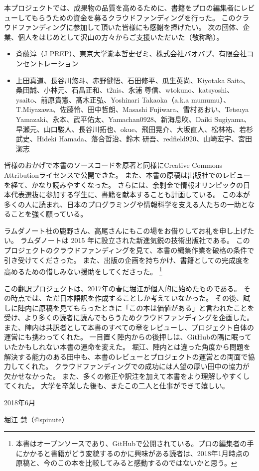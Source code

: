 本プロジェクトでは、成果物の品質を高めるために、書籍をプロの編集者にレビューしてもらうための資金を募るクラウドファンディングを行った。
このクラウドファンディングに参加して頂いた皆様にも感謝を捧げたい。
次の団体、企業、個人をはじめとして沢山の方々からご支援いただいた（敬称略）。 %
\begin{itemize}
\item 斉藤淳（J PREP）、東京大学瀧本哲史ゼミ、株式会社バオバブ、有限会社コンセントレーション
\item 上田真道、長谷川悠斗、赤野健悟、石田修平、瓜生英尚、Kiyotaka Saito、桑田誠、小林元、石畠正和、t2nis、永浦 尊信、wtokuno、katsyoshi、ysaito、前原貴憲、髙木正弘、Yoshinari Takaoka（a.k.a mumumu）、T.Miyazawa、佐藤怜、田中哲朗、Masashi Fujiwara、雪村あおい、Tetsuya Yamazaki、永本、武平佑太、Yamachan0928、新海息吹、Daiki Sugiyama、早瀬元、山口駿人、長谷川拓也、okue、飛田晃介、大坂直人、松林祐、若杉武史、Hideki Hamada、落合哲治、鈴木 研吾、redfield920、山崎宏宇、宮田潔志
\end{itemize}

皆様のおかげで本書のソースコードを原著と同様にCreative Commons Attributionライセンスで公開できた。
また、本書の原稿は出版社でのレビューを経て、かなり読みやすくなった。
さらには、余剰金で情報オリンピックの日本代表選抜に参加する学生に、書籍を献本することも計画している。
この本が多くの人に読まれ、日本のプログラミングや情報科学を支える人たちの一助となることを強く願っている。

ラムダノート社の鹿野さん、高尾さんにもこの場をお借りしてお礼を申し上げたい。
ラムダノートは 2015 年に設立された新進気鋭の技術出版社である。
このプロジェクトのクラウドファンディングを見て、本書の編集作業を破格の条件で引き受けてくださった。
また、出版の企画を持ちかけ、書籍としての完成度を高めるための惜しみない援助をしてくださった。
\footnote{本書はオープンソースであり、GitHubで公開されている。プロの編集者の手にかかると書籍がどう変貌するのかに興味がある読者は、2018年1月時点の原稿と、今のこの本を比較してみると感動するのではないかと思う。}

この翻訳プロジェクトは、2017年の春に堀江が個人的に始めたものである。
その時点では、ただ日本語訳を作成することしか考えていなかった。
その後、試しに陣内に原稿を見てもらったときに「この本は価値がある」と言われたことを受け、より多くの読者に読んでもらうためクラウドファンディングを企画した。
また、陣内は共訳者として本書のすべての章をレビューし、プロジェクト自体の運営にも携わってくれた。
一目置く陣内からの後押しは、GitHubの隅に眠っていたかもしれない本書の運命を変えた。
堀江、陣内とは違った角度から問題を解決する能力のある田中も、本書のレビューとプロジェクトの運営との両面で協力してくれた。
クラウドファンディングでの成功には人望の厚い田中の協力が欠かせなかった。
また、多くの修正や訳注を加えて本書をより理解しやすくしてくれた。
大学を卒業した後も、またこの二人と仕事ができて嬉しい。

\noindent\hspace*{2em}
2018年6月

\hfill 堀江 慧（@spinute）
